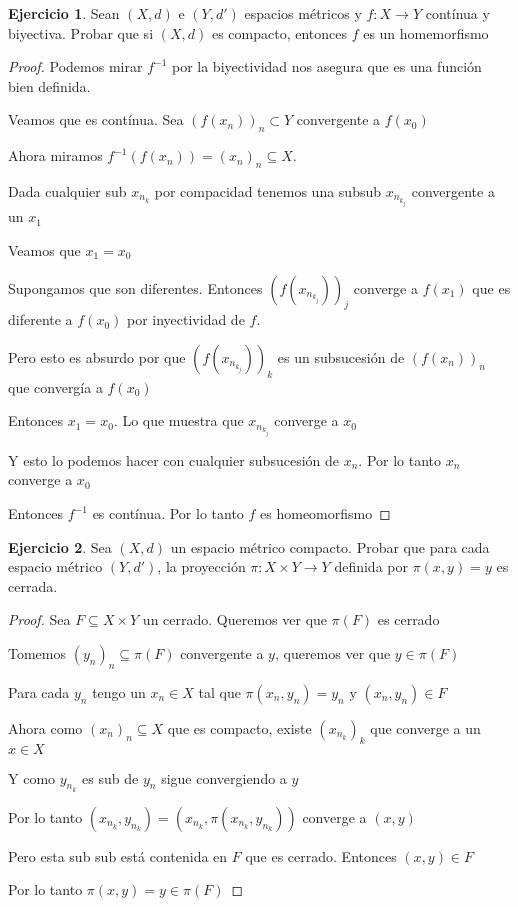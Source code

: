 \documentclass[11pt]{report}
\newcommand{\ra}{\rightarrow}
\theoremstyle{definition}
\newtheorem{ej}{Ejercicio}
\begin{document}
	\begin{ej}
		Sean $(X,d)$ e $(Y,d')$ espacios métricos y $f: X \ra Y$ contínua y biyectiva. Probar que si $(X,d)$ es compacto, entonces $f$ es un homemorfismo
		\begin{proof}
			Podemos mirar $f^{-1}$ por la biyectividad nos asegura que es una función bien definida. 

 			Veamos que es contínua. Sea $(f(x_n))_n \subset Y$  convergente a $f(x_0)$

			Ahora miramos $f^{-1}(f(x_n)) = (x_n)_n \subseteq X$. 

			Dada cualquier sub $x_{n_k}$ por compacidad tenemos una subsub $x_{n_{k_j}}$ convergente a un $x_1$ 

			Veamos que $x_1 = x_0$

			Supongamos que son diferentes. Entonces $(f(x_{n_{k_j}}))_j$ converge a $f(x_1)$ que es diferente a $f(x_0)$ por inyectividad de $f$.

			Pero esto es absurdo por que $(f(x_{n_{k_j}}))_k$ es un subsucesión de $(f(x_n))_n$ que convergía a $f(x_0)$

			Entonces $x_1 = x_0$. Lo que muestra que $x_{n_{k_j}}$ converge a $x_0$

			Y esto lo podemos hacer con cualquier subsucesión de $x_n$. Por lo tanto $x_n$ converge a $x_0$

			Entonces $f^{-1}$ es contínua. Por lo tanto $f$ es homeomorfismo

		\end{proof}
	\end{ej}
	
	\begin{ej}
		Sea $(X,d)$ un espacio métrico compacto. Probar que para cada espacio métrico $(Y,d')$, la proyección $\pi :X \times Y \ra Y$ definida por $\pi (x,y) = y$ es cerrada.
		\begin{proof}
			Sea $F \subseteq X \times Y$ un cerrado. Queremos ver que $\pi (F)$ es cerrado

			Tomemos $(y_n)_n \subseteq \pi(F)$ convergente a $y$, queremos ver que $y \in \pi (F)$

			Para cada $y_n$ tengo un $x_n \in X$ tal que $\pi (x_n,y_n) = y_n$ y $(x_n,y_n) \in F$

			Ahora como $(x_n)_n \subseteq X$ que es compacto, existe $(x_{n_k})_k$ que converge a un $x \in X$

			Y como $y_{n_k}$ es sub de $y_n$ sigue convergiendo a $y$

			Por lo tanto $(x_{n_k},y_{n_k}) = (x_{n_k},\pi(x_{n_k},y_{n_k}))$ converge a $(x,y)$

			Pero esta sub sub está contenida en $F$ que es cerrado. Entonces $(x,y) \in F$

			Por lo tanto $\pi (x,y) = y \in \pi (F)$

		\end{proof}
		
	\end{ej}
	
\end{document}
